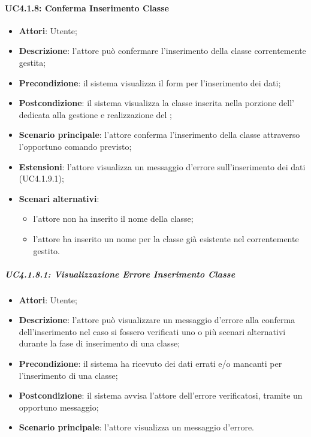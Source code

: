 \paragraph{UC4.1.8: Conferma Inserimento Classe}
\label{UC4.1.8}
\begin{itemize}
	\item \textbf{Attori}: Utente;
	\item \textbf{Descrizione}: l'attore può confermare l'inserimento della classe correntemente gestita;
	\item \textbf{Precondizione}: il sistema visualizza il form per l'inserimento dei dati;
	\item \textbf{Postcondizione}: il sistema visualizza la classe inserita nella porzione dell' dedicata alla gestione e realizzazione del ;
	\item \textbf{Scenario principale}: l'attore conferma l'inserimento della classe attraverso l'opportuno comando previsto;
	\item \textbf{Estensioni}: l'attore visualizza un messaggio d'errore sull'inserimento dei dati (UC4.1.9.1);
	\item \textbf{Scenari alternativi}:
	\begin{itemize}
		\item l'attore non ha inserito il nome della classe;
		\item l'attore ha inserito un nome per la classe già esistente nel  correntemente gestito.
	\end{itemize}
\end{itemize}

\subparagraph{UC4.1.8.1: Visualizzazione Errore Inserimento Classe}
\label{UC4.1.8.1}
\begin{itemize}
	\item \textbf{Attori}: Utente;
	\item \textbf{Descrizione}: l'attore può visualizzare un messaggio d'errore alla conferma dell'inserimento nel caso si fossero verificati uno o più scenari alternativi durante la fase di inserimento di una classe;
	\item \textbf{Precondizione}: il sistema ha ricevuto dei dati errati e/o mancanti per l'inserimento di una classe;
	\item \textbf{Postcondizione}: il sistema avvisa l'attore dell'errore verificatosi, tramite un opportuno messaggio;
	\item \textbf{Scenario principale}: l'attore visualizza un messaggio d'errore.
\end{itemize}

